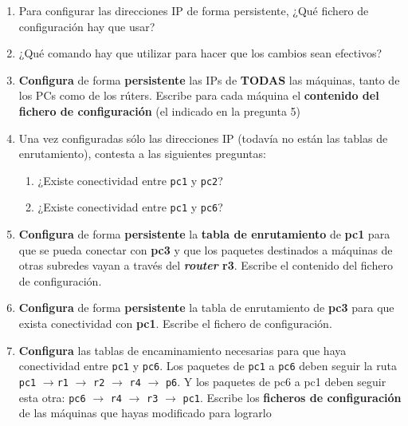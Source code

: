 \documentclass[a4paper]{article}
\begin{document}
\begin{enumerate}
	\item Para configurar las direcciones IP de forma persistente, ¿Qué fichero de 
	configuración hay que usar?  
	
	\item ¿Qué comando hay que utilizar para hacer que los cambios sean efectivos?
	
	\item \textbf{Configura} de forma \textbf{persistente} las IPs de \textbf{TODAS} las máquinas,  tanto de los PCs como de los rúters. Escribe para cada máquina el \textbf{contenido del fichero de configuración} (el indicado en la pregunta 5)
	
	\item Una vez configuradas sólo las direcciones IP (todavía no están las tablas de enrutamiento), contesta a las siguientes preguntas:
	
	\begin{enumerate}[label*=\arabic*.]
		\item ¿Existe conectividad entre \texttt{pc1} y \texttt{pc2}?  
		\item ¿Existe conectividad entre \texttt{pc1} y \texttt{pc6}?
	\end{enumerate}
    \smallskip
    
    \item \textbf{Configura} de forma \textbf{persistente} la \textbf{tabla de enrutamiento} de \textbf{pc1} para que se pueda conectar con \textbf{pc3} y que los paquetes destinados a máquinas de otras subredes vayan a través del \textbf{\textit{router} r3}. Escribe el contenido del
    fichero de configuración.
    
    \item \textbf{Configura} de forma \textbf{persistente} la tabla de enrutamiento de \textbf{pc3} para que exista conectividad con \textbf{pc1}. Escribe el fichero de configuración.
    
    \item \textbf{Configura} las tablas de encaminamiento necesarias para que haya conectividad entre \texttt{pc1} y \texttt{pc6}. Los paquetes de \texttt{pc1} a \texttt{pc6} deben seguir la ruta \texttt{pc1} $\rightarrow$\texttt{r1} $\rightarrow$ 
    \texttt{r2} $\rightarrow$ \texttt{r4} $\rightarrow$ \texttt{p6}.  Y los
    paquetes de pc6 a pc1 deben seguir esta otra: \texttt{pc6} $\rightarrow$ \texttt{r4} 
    $\rightarrow$ \texttt{r3} $\rightarrow$ \texttt{pc1}. Escribe los \textbf{ficheros de configuración} de las máquinas que hayas modificado para lograrlo
    

\end{enumerate}
\end{document}
